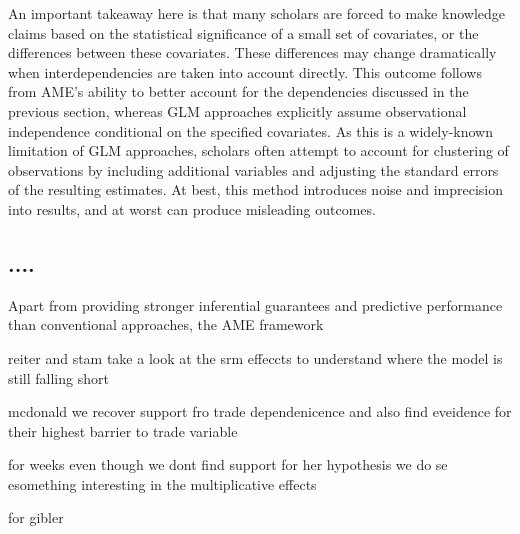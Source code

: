An important takeaway here is that many scholars are forced to make knowledge claims based on the statistical significance of a small set of covariates, or the differences between these covariates. These differences may change dramatically when interdependencies are taken into account directly. This outcome follows from AME's ability to better account for the dependencies discussed in the previous section, whereas GLM approaches explicitly assume observational independence conditional on the specified covariates. As this is a widely-known limitation of GLM approaches, scholars often attempt to account for clustering of observations by including additional variables and adjusting the standard errors of the resulting estimates. At best, this method introduces noise and imprecision into results, and at worst can produce misleading outcomes. 

\subsection{....}

Apart from providing stronger inferential guarantees and predictive performance than conventional approaches, the AME framework 


reiter and stam take a look at the srm effeccts to understand where the model is still falling short

mcdonald we recover support fro trade dependenicence and also find eveidence for their highest barrier to trade variable

for weeks even though we dont find support for her hypothesis we do se esomething interesting in the multiplicative effects

for gibler 

